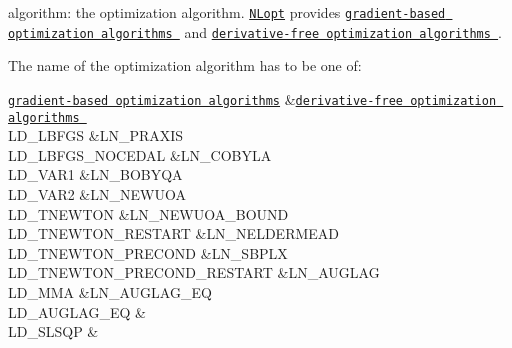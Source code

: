 \documentclass{tufte-book}
\begin{document}
\begin{DoxyItemize}
\item {\ttfamily algorithm}\-: the optimization algorithm. \href{http://ab-initio.mit.edu/wiki/index.php/NLopt}{\tt \-N\-Lopt} provides \href{http://ab-initio.mit.edu/wiki/index.php/NLopt_Algorithms#Local_gradient-based_optimization}{\tt gradient-\/based optimization algorithms } and \href{http://ab-initio.mit.edu/wiki/index.php/NLopt_Algorithms#Local_derivative-free_optimization}{\tt derivative-\/free optimization algorithms }.

\-The name of the optimization algorithm has to be one of\-:

\begin{TabularC}{2}
\hline
\href{http://ab-initio.mit.edu/wiki/index.php/NLopt_Algorithms#Local_gradient-based_optimization}{\tt gradient-\/based optimization algorithms}  &\href{http://ab-initio.mit.edu/wiki/index.php/NLopt_Algorithms#Local_derivative-free_optimization}{\tt derivative-\/free optimization algorithms }  \\
{\ttfamily \-L\-D\-\_\-\-L\-B\-F\-G\-S } &{\ttfamily \-L\-N\-\_\-\-P\-R\-A\-X\-I\-S}  \\
{\ttfamily \-L\-D\-\_\-\-L\-B\-F\-G\-S\-\_\-\-N\-O\-C\-E\-D\-A\-L } &{\ttfamily \-L\-N\-\_\-\-C\-O\-B\-Y\-L\-A}  \\
{\ttfamily \-L\-D\-\_\-\-V\-A\-R1 } &{\ttfamily \-L\-N\-\_\-\-B\-O\-B\-Y\-Q\-A}  \\
{\ttfamily \-L\-D\-\_\-\-V\-A\-R2 } &{\ttfamily \-L\-N\-\_\-\-N\-E\-W\-U\-O\-A}  \\
{\ttfamily \-L\-D\-\_\-\-T\-N\-E\-W\-T\-O\-N } &{\ttfamily \-L\-N\-\_\-\-N\-E\-W\-U\-O\-A\-\_\-\-B\-O\-U\-N\-D}  \\
{\ttfamily \-L\-D\-\_\-\-T\-N\-E\-W\-T\-O\-N\-\_\-\-R\-E\-S\-T\-A\-R\-T } &{\ttfamily \-L\-N\-\_\-\-N\-E\-L\-D\-E\-R\-M\-E\-A\-D}  \\
{\ttfamily \-L\-D\-\_\-\-T\-N\-E\-W\-T\-O\-N\-\_\-\-P\-R\-E\-C\-O\-N\-D } &{\ttfamily \-L\-N\-\_\-\-S\-B\-P\-L\-X}  \\
{\ttfamily \-L\-D\-\_\-\-T\-N\-E\-W\-T\-O\-N\-\_\-\-P\-R\-E\-C\-O\-N\-D\-\_\-\-R\-E\-S\-T\-A\-R\-T } &{\ttfamily \-L\-N\-\_\-\-A\-U\-G\-L\-A\-G}  \\
{\ttfamily \-L\-D\-\_\-\-M\-M\-A } &{\ttfamily \-L\-N\-\_\-\-A\-U\-G\-L\-A\-G\-\_\-\-E\-Q}  \\
{\ttfamily \-L\-D\-\_\-\-A\-U\-G\-L\-A\-G\-\_\-\-E\-Q } &\\
{\ttfamily \-L\-D\-\_\-\-S\-L\-S\-Q\-P } &\\
\end{TabularC}




\end{DoxyItemize}
\end{document}
